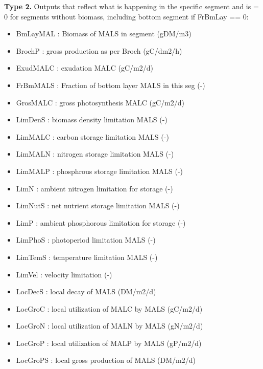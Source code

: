 \documentclass{deltares_manual}
\begin{document}
\textbf{Type 2.} Outputs that reflect what is happening in the specific segment and is = 0 for segments without biomass, including bottom segment if FrBmLay == 0:
\begin{itemize}
	\item BmLayMAL : Biomass of MALS in segment                              (gDM/m3) 
	\item BrochP   : gross production as per Broch                           (gC/dm2/h) 
	\item ExudMALC : exudation MALC                                          (gC/m2/d)  
	\item FrBmMALS : Fraction of bottom layer MALS in this seg               (-)         
	\item GrosMALC : gross photosynthesis MALC                               (gC/m2/d)  
	\item LimDenS  : biomass density limitation MALS                         (-) 
	\item LimMALC  : carbon storage limitation MALS                          (-) 
	\item LimMALN  : nitrogen storage limitation MALS                        (-) 
	\item LimMALP  : phosphrous storage limitation MALS                      (-) 
	\item LimN     : ambient nitrogen limitation for storage                 (-) 
	\item LimNutS  : net nutrient storage limitation MALS                    (-) 
	\item LimP     : ambient phosphorous limitation for storage              (-) 
	\item LimPhoS  : photoperiod limitation MALS                             (-) 
	\item LimTemS  : temperature limitation MALS                             (-) 
	\item LimVel   : velocity limitation                                     (-) 
	\item LocDecS  : local decay of MALS                                     (DM/m2/d) 
	\item LocGroC  : local utilization of MALC by MALS                       (gC/m2/d) 
	\item LocGroN  : local utilization of MALN by MALS                       (gN/m2/d) 
	\item LocGroP  : local utilization of MALP by MALS                       (gP/m2/d) 
	\item LocGroPS : local gross production of MALS                          (DM/m2/d) 

\end{itemize}
\end{document}
